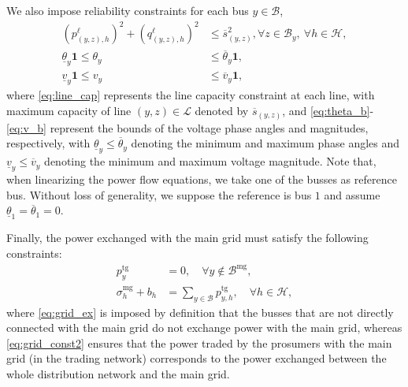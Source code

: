 \documentclass{IEEEtran}  %
\newcommand{\mc}{\mathcal}
\newcommand{\0}{\mathbf{0}}
\newcommand{\1}{\mathbf{1}}
\begin{document}
\smallskip
We also impose reliability constraints for each bus $y \in \mc B$, 
\begin{subequations}
\label{eq:line}
\begin{align}
	(p_{(y,z),h}^{\ell})^2 + (q_{(y,z),h}^{\ell})^2 &\leq \overline{s}_{(y,z)}^2, \forall z\in\mc B_y, \ \forall h\in \mc H, \label{eq:line_cap}\\
	\underline{\theta}_y\1 \leq \theta_y &\leq \overline{\theta}_y\1,  \label{eq:theta_b}\\
	\underline{v}_y\1 \leq v_y &\leq \overline v_y\1, \label{eq:v_b}
\end{align}
\end{subequations}
where \eqref{eq:line_cap} represents the line capacity constraint at each line, with maximum capacity of line $(y,z) \in \mc L$ denoted by $\overline{s}_{(y,z)}$, and \eqref{eq:theta_b}-\eqref{eq:v_b} represent the bounds of the voltage phase angles and magnitudes, respectively, with $\underline{\theta}_y \leq \overline{\theta}_y$ denoting the minimum and maximum phase angles and $\underline{v}_y\leq \overline v_y$ denoting the minimum and maximum voltage magnitude. Note that, when linearizing the power flow equations, we take one of the busses as reference bus. Without loss of generality, we suppose the reference is bus $1$ and assume $\underline{\theta}_1 = \overline{\theta}_1=0$.  \color{black}

Finally, the power exchanged with the main grid must satisfy the following constraints:
\begin{subequations}
\begin{align}
	p^{\mathrm{tg}}_{y} &= 0, \quad \forall y \notin \mc B^{\mathrm{mg}}, \label{eq:grid_ex}\\
	\sigma^{\textrm{mg}}_h + b_h &= \sum_{y\in\mc B}p^{\mathrm{tg}}_{y,h}, \quad \forall h \in \mathcal H, \label{eq:grid_const2}
\end{align}
\end{subequations}
where \eqref{eq:grid_ex} is imposed by definition that the busses that are not directly connected with the main grid do not exchange  power with the main grid, whereas \eqref{eq:grid_const2} ensures that the power traded by the prosumers with the main grid (in the trading network) corresponds to the power exchanged between the whole distribution network and the main grid.
\end{document}
